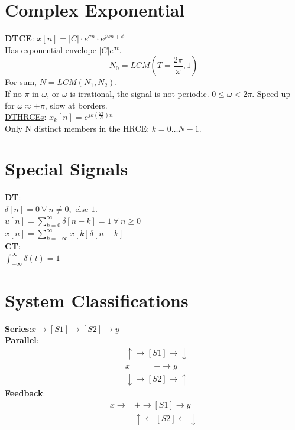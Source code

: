 \documentclass[twocolumn]{article}
\begin{document}
\section*{Complex Exponential}
\textbf{DTCE}:
$x[n] = |C|\cdot e^{\sigma n} \cdot e^{j\omega n +\phi}$\\
Has exponential envelope $|C|e^{\sigma t}$.\\
\begin{equation*}
    N_0 = LCM\left(T = \frac{2\pi}{\omega}, 1\right)
\end{equation*}
For sum, $N = LCM(N_1,N_2)$.\\
If no $\pi$ in $\omega$, or $\omega$ is irrational, the signal is not periodic.
$0\leq \omega < 2\pi$. Speed up for $\omega\approx\pm\pi$, slow at borders.\\
\underline{DTHRCEs}: $x_k[n] = e^{jk(\frac{2\pi}{N})n}$\\
Only N distinct members in the HRCE: $k = 0 \ldots N-1$.
\section*{Special Signals}
\textbf{DT}:\\
$\delta[n] = 0 ~\forall~ n \neq 0,\text{ else } 1$.\\
$u[n] =\sum_{k=0}^{\infty}\delta[n-k] = 1 ~\forall~ n\geq 0$\\
$x[n] = \sum_{k=-\infty}^{\infty}x[k]\delta[n-k]$\\
\textbf{CT}:\\
$\int_{-\infty}^{\infty}\delta(t) = 1$
\section*{System Classifications}
\textbf{Series}:$x \rightarrow [S1]\rightarrow[S2]\rightarrow y$\\
\textbf{Parallel}:
\begin{align*}
    &\uparrow\rightarrow [S1] \rightarrow \downarrow\\
    &x ~~~~~~~~~~~~~ + \rightarrow y\\
    &\downarrow\rightarrow [S2]\rightarrow \uparrow
\end{align*}
\textbf{Feedback}:
\begin{align*}
    x\rightarrow &+\rightarrow [S1] \rightarrow y\\
    &\uparrow\leftarrow [S2]\leftarrow \downarrow
\end{align*}
\end{document}
